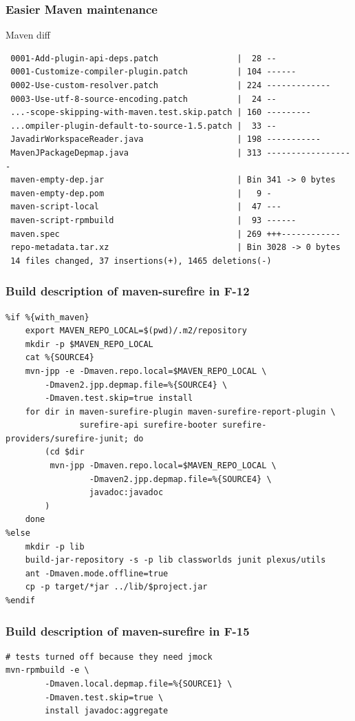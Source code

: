 \documentclass[pdftex,unicode,xcolor=table]{beamer}
\begin{document}
\begin{frame}[fragile]
  \frametitle{Easier Maven maintenance}
  \begin{block}{Maven diff}
    \scriptsize
\begin{verbatim}
 0001-Add-plugin-api-deps.patch                |  28 --
 0001-Customize-compiler-plugin.patch          | 104 ------
 0002-Use-custom-resolver.patch                | 224 -------------
 0003-Use-utf-8-source-encoding.patch          |  24 --
 ...-scope-skipping-with-maven.test.skip.patch | 160 ---------
 ...ompiler-plugin-default-to-source-1.5.patch |  33 --
 JavadirWorkspaceReader.java                   | 198 -----------
 MavenJPackageDepmap.java                      | 313 ------------------
 maven-empty-dep.jar                           | Bin 341 -> 0 bytes
 maven-empty-dep.pom                           |   9 -
 maven-script-local                            |  47 ---
 maven-script-rpmbuild                         |  93 ------
 maven.spec                                    | 269 +++------------
 repo-metadata.tar.xz                          | Bin 3028 -> 0 bytes
 14 files changed, 37 insertions(+), 1465 deletions(-)
\end{verbatim}
  \end{block}
\end{frame}


\begin{frame}[fragile]
  \frametitle{Build description of maven-surefire in F-12}
  \scriptsize
  \begin{verbatim}
%if %{with_maven}
    export MAVEN_REPO_LOCAL=$(pwd)/.m2/repository
    mkdir -p $MAVEN_REPO_LOCAL
    cat %{SOURCE4}
    mvn-jpp -e -Dmaven.repo.local=$MAVEN_REPO_LOCAL \
        -Dmaven2.jpp.depmap.file=%{SOURCE4} \
        -Dmaven.test.skip=true install
    for dir in maven-surefire-plugin maven-surefire-report-plugin \
               surefire-api surefire-booter surefire-providers/surefire-junit; do
        (cd $dir
         mvn-jpp -Dmaven.repo.local=$MAVEN_REPO_LOCAL \
                 -Dmaven2.jpp.depmap.file=%{SOURCE4} \
                 javadoc:javadoc
        )
    done
%else
    mkdir -p lib
    build-jar-repository -s -p lib classworlds junit plexus/utils
    ant -Dmaven.mode.offline=true
    cp -p target/*jar ../lib/$project.jar
%endif
  \end{verbatim}
  \note{Note!}
\end{frame}

\begin{frame}[fragile]
  \frametitle{Build description of maven-surefire in F-15}
  \scriptsize
  \begin{verbatim}
# tests turned off because they need jmock
mvn-rpmbuild -e \
        -Dmaven.local.depmap.file=%{SOURCE1} \
        -Dmaven.test.skip=true \
        install javadoc:aggregate
  \end{verbatim}
  \note{Note!}
\end{frame}
\end{document}
